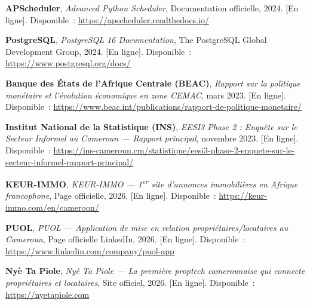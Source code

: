 \begin{enumerate}[label={[\arabic*]}, leftmargin=1.2cm, labelsep=0.3cm, itemsep=0.8em]
    \item \label{ref:apscheduler} \textbf{APScheduler}, \textit{Advanced Python Scheduler}, Documentation officielle, 2024. [En ligne]. Disponible~: \url{https://apscheduler.readthedocs.io/}

    \item \label{ref:postgresql} \textbf{PostgreSQL}, \textit{PostgreSQL 16 Documentation}, The PostgreSQL Global Development Group, 2024. [En ligne]. Disponible~: \url{https://www.postgresql.org/docs/}

    \item \label{ref:beac} \textbf{Banque des États de l'Afrique Centrale (BEAC)}, \textit{Rapport sur la politique monétaire et l'évolution économique en zone CEMAC}, mars 2023. [En ligne]. Disponible~: \url{https://www.beac.int/publications/rapport-de-politique-monetaire/}

    \item \label{ref:ins} \textbf{Institut National de la Statistique (INS)}, \textit{EESI3 Phase 2 : Enquête sur le Secteur Informel au Cameroun --- Rapport principal}, novembre 2023. [En ligne]. Disponible~: \url{https://ins-cameroun.cm/statistique/eesi3-phase-2-enquete-sur-le-secteur-informel-rapport-principal/}

    \item \label{ref:keurimmo} \textbf{KEUR-IMMO}, \textit{KEUR-IMMO --- 1\textsuperscript{er} site d'annonces immobilières en Afrique francophone}, Page officielle, 2026. [En ligne]. Disponible~: \url{https://keur-immo.com/en/cameroon/}

    \item \label{ref:puol} \textbf{PUOL}, \textit{PUOL --- Application de mise en relation propriétaires/locataires au Cameroun}, Page officielle LinkedIn, 2026. [En ligne]. Disponible~: \url{https://www.linkedin.com/company/puol-app}

    \item \label{ref:nyetapiole} \textbf{Nyè Ta Piole}, \textit{Nyè Ta Piole --- La première proptech camerounaise qui connecte propriétaires et locataires}, Site officiel, 2026. [En ligne]. Disponible~: \url{https://nyetapiole.com}

\end{enumerate}